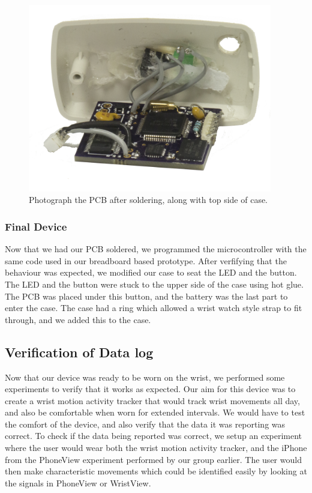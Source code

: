 \begin{figure}
\begin{center}
\includegraphics[width=0.95\textwidth]{images/PCBBare.jpg}
\caption{Photograph the PCB after soldering, along with top side of case.}
\label{Fig:PCBwithCase}
\end{center}
\end{figure}


\subsubsection{Final Device}
\label{Sec:FinalDevice}
Now that we had our PCB soldered,
we programmed the microcontroller with the same code used in our breadboard based prototype.
After verfifying that the behaviour was expected,
we modified our case to seat the LED and the button.
The LED and the button were stuck to the upper side of the case using hot glue.
The PCB was placed under this button, and the battery was the last part to enter the case.
The case had a ring which allowed a wrist watch style strap to fit through,
and we added this to the case.

\subsection{Verification of Data log}
\label{Sec:Motion Data}
Now that our device was ready to be worn on the wrist,
we performed some experiments to verify that it works as expected.
Our aim for this device was to create a wrist motion activity tracker that would track wrist movements all day,
and also be comfortable when worn for extended intervals.
We would have to test the comfort of the device,
and also verify that the data it was reporting was correct.
To check if the data being reported was correct,
we setup an experiment where the user would wear both the wrist motion activity tracker,
and the iPhone from the PhoneView experiment performed by our group earlier.
The user would then make characteristic movements which could be identified easily by looking at the signals in PhoneView or WristView.


